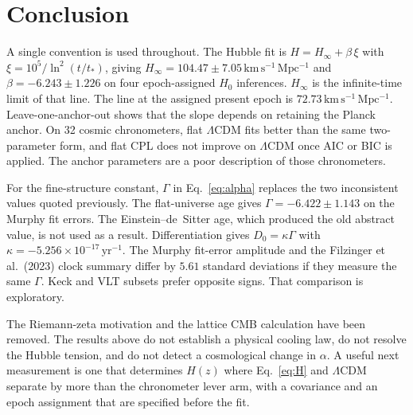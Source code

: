 \section{Conclusion}
\label{sec:conclusion}

A single convention is used throughout.
The Hubble fit is $H=H_{\infty}+\beta\,\xi$ with $\xi=10^{5}/\ln^{2}(t/t_{*})$, giving $H_{\infty}=104.47\pm7.05\,\mathrm{km\,s^{-1}\,Mpc^{-1}}$ and $\beta=-6.243\pm1.226$ on four epoch-assigned $H_{0}$ inferences.
$H_{\infty}$ is the infinite-time limit of that line.
The line at the assigned present epoch is $72.73\,\mathrm{km\,s^{-1}\,Mpc^{-1}}$.
Leave-one-anchor-out shows that the slope depends on retaining the Planck anchor.
On 32 cosmic chronometers, flat $\Lambda$CDM fits better than the same two-parameter form, and flat CPL does not improve on $\Lambda$CDM once AIC or BIC is applied.
The anchor parameters are a poor description of those chronometers.

For the fine-structure constant, $\Gamma$ in Eq.~\eqref{eq:alpha} replaces the two inconsistent values quoted previously.
The flat-universe age gives $\Gamma=-6.422\pm1.143$ on the Murphy fit errors.
The Einstein--de~Sitter age, which produced the old abstract value, is not used as a result.
Differentiation gives $D_{0}=\kappa\Gamma$ with $\kappa=-5.256\times10^{-17}\,\mathrm{yr}^{-1}$.
The Murphy fit-error amplitude and the Filzinger et al.\ (2023) clock summary differ by $5.61$ standard deviations if they measure the same $\Gamma$.
Keck and VLT subsets prefer opposite signs.
That comparison is exploratory.

The Riemann-zeta motivation and the lattice CMB calculation have been removed.
The results above do not establish a physical cooling law, do not resolve the Hubble tension, and do not detect a cosmological change in $\alpha$.
A useful next measurement is one that determines $H(z)$ where Eq.~\eqref{eq:H} and $\Lambda$CDM separate by more than the chronometer lever arm, with a covariance and an epoch assignment that are specified before the fit.
